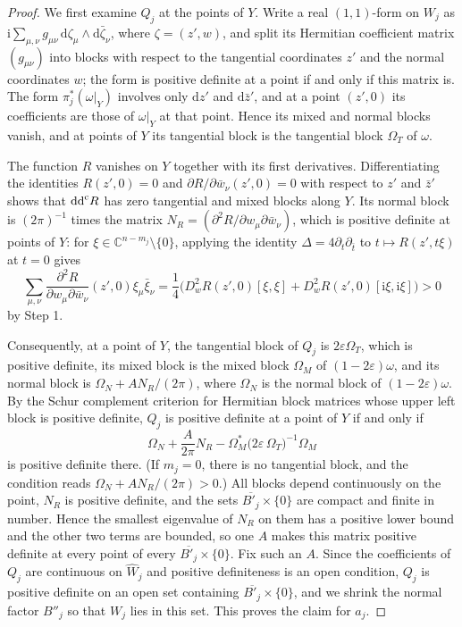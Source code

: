 \begin{proof}
We first examine $Q_j$ at the points of $Y$. Write a real $(1,1)$-form on $W_j$ as $\mathrm i\sum_{\mu,\nu}g_{\mu\nu}\,\mathrm d\zeta_\mu\wedge\mathrm d\bar\zeta_\nu$, where $\zeta=(z',w)$, and split its Hermitian coefficient matrix $(g_{\mu\nu})$ into blocks with respect to the tangential coordinates $z'$ and the normal coordinates $w$; the form is positive definite at a point if and only if this matrix is. The form $\pi_j^*(\omega|_Y)$ involves only $\mathrm dz'$ and $\mathrm d\bar z'$, and at a point $(z',0)$ its coefficients are those of $\omega|_Y$ at that point. Hence its mixed and normal blocks vanish, and at points of $Y$ its tangential block is the tangential block $\Omega_T$ of $\omega$.

The function $R$ vanishes on $Y$ together with its first derivatives. Differentiating the identities $R(z',0)=0$ and $\partial R/\partial\bar w_\nu(z',0)=0$ with respect to $z'$ and $\bar z'$ shows that $\mathrm{dd}^{\mathrm{c}} R$ has zero tangential and mixed blocks along $Y$. Its normal block is $(2\pi)^{-1}$ times the matrix $N_R=(\partial^2R/\partial w_\mu\partial\bar w_\nu)$, which is positive definite at points of $Y$: for $\xi\in\mathbb C^{n-m_j}\setminus\{0\}$, applying the identity $\Delta=4\partial_t\partial_{\bar t}$ to $t\mapsto R(z',t\xi)$ at $t=0$ gives
\[
 \sum_{\mu,\nu}\frac{\partial^2R}{\partial w_\mu\partial\bar w_\nu}(z',0)\xi_\mu\bar\xi_\nu=\frac14\bigl(D_w^2R(z',0)[\xi,\xi]+D_w^2R(z',0)[\mathrm i\xi,\mathrm i\xi]\bigr)>0
\]
by Step 1.

Consequently, at a point of $Y$, the tangential block of $Q_j$ is $2\varepsilon\Omega_T$, which is positive definite, its mixed block is the mixed block $\Omega_M$ of $(1-2\varepsilon)\omega$, and its normal block is $\Omega_N+AN_R/(2\pi)$, where $\Omega_N$ is the normal block of $(1-2\varepsilon)\omega$. By the Schur complement criterion for Hermitian block matrices whose upper left block is positive definite, $Q_j$ is positive definite at a point of $Y$ if and only if
\[
 \Omega_N+\frac A{2\pi}N_R-\Omega_M^*\bigl(2\varepsilon\,\Omega_T\bigr)^{-1}\Omega_M
\]
is positive definite there. (If $m_j=0$, there is no tangential block, and the condition reads $\Omega_N+AN_R/(2\pi)>0$.) All blocks depend continuously on the point, $N_R$ is positive definite, and the sets $\overline{B'_j}\times\{0\}$ are compact and finite in number. Hence the smallest eigenvalue of $N_R$ on them has a positive lower bound and the other two terms are bounded, so one $A$ makes this matrix positive definite at every point of every $\overline{B'_j}\times\{0\}$. Fix such an $A$. Since the coefficients of $Q_j$ are continuous on $\widehat W_j$ and positive definiteness is an open condition, $Q_j$ is positive definite on an open set containing $\overline{B'_j}\times\{0\}$, and we shrink the normal factor $B''_j$ so that $W_j$ lies in this set. This proves the claim for $a_j$.


\end{proof}
